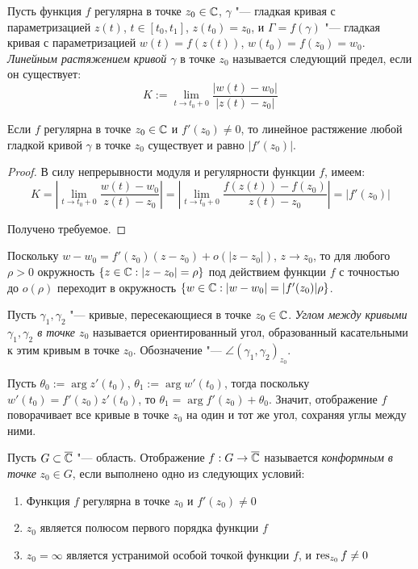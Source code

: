 \begin{definition}
	Пусть функция $f$ регулярна в точке $z_0 \in \mathbb{C}$, $\gamma$ "--- гладкая кривая с параметризацией $z(t)$, $t \in [t_0, t_1]$, $z(t_0) = z_0$, и $\Gamma = f(\gamma)$ "--- гладкая кривая с параметризацией $w(t) = f(z(t))$, $w(t_0) = f(z_0) = w_0$. \textit{Линейным растяжением кривой $\gamma$} в точке $z_0$ называется следующий предел, если он существует:
	\[K := \lim_{t \to t_0 + 0}\frac{|w(t) - w_0|}{|z(t) - z_0|}\]
\end{definition}

\begin{proposition}
	Если $f$ регулярна в точке $z_0 \in \mathbb{C}$ и $f'(z_0) \ne 0$, то линейное растяжение любой гладкой кривой $\gamma$ в точке $z_0$ существует и равно $|f'(z_0)|$.
\end{proposition}

\begin{proof}
	В силу непрерывности модуля и регулярности функции $f$, имеем:
	\[K = \left|\lim_{t \to t_0 + 0}\frac{w(t) - w_0}{z(t) - z_0}\right| = \left|\lim_{t \to t_0 + 0}\frac{f(z(t)) - f(z_0)}{z(t) - z_0}\right| = |f'(z_0)|\]
	
	Получено требуемое.
\end{proof}

\begin{note}
	Поскольку $w - w_0 = f'(z_0)(z-z_0) + o(|z - z_0|)$, $z \to z_0$, то для любого $\rho > 0$ окружность $\{z \in \mathbb{C} : |z - z_0| = \rho\}$ под действием функции $f$ с точностью до $o(\rho)$ переходит в окружность $\{w \in \mathbb{C} : |w - w_0| = |f'(z_0)|\rho\}$.
\end{note}

\begin{definition}
	Пусть $\gamma_1, \gamma_2$ "--- кривые, пересекающиеся в точке $z_0 \in \mathbb{C}$. \textit{Углом между кривыми $\gamma_1, \gamma_2$ в точке $z_0$} называется ориентированный угол, образованный касательными к этим кривым в точке $z_0$.  Обозначение "--- $\angle(\gamma_1, \gamma_2)_{z_0}$.
\end{definition}

\begin{note}
	Пусть $\theta_0 := \arg{z'(t_0)}$, $\theta_1 := \arg{w'(t_0)}$, тогда поскольку $w'(t_0) = f'(z_0)z'(t_0)$, то $\theta_1 = \arg{f'(z_0)} + \theta_0$. Значит, отображение $f$ поворачивает все кривые в точке $z_0$ на один и тот же угол, сохраняя углы между ними.
\end{note}

\begin{definition}
	Пусть $G \subset \overline{\mathbb{C}}$ "--- область. Отображение $f : G \to \overline{\mathbb{C}}$ называется \textit{конформным в точке} $z_0 \in G$, если выполнено одно из следующих условий:
	\begin{enumerate}
		\item Функция $f$ регулярна в точке $z_0$ и $f'(z_0) \ne 0$
		\item $z_0$ является полюсом первого порядка функции $f$
		\item $z_0 = \infty$ является устранимой особой точкой функции $f$, и $\operatorname*{res}_{z_0}f \ne 0$
	\end{enumerate}
\end{definition}

